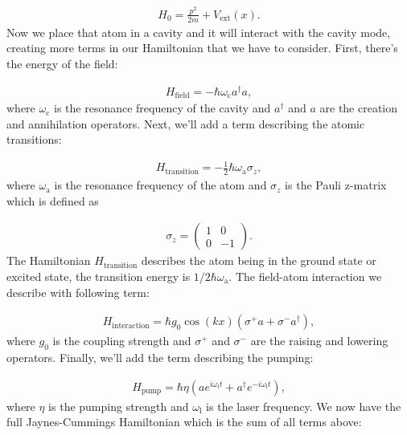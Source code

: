 \begin{align}
H_0 = \frac{p^2}{2m} + V_\text{ext}(x).
\end{align}Now we place that atom in a cavity and it will interact with the cavity mode, creating more terms in our Hamiltonian that we have to consider. First, there's the energy of the field:

\begin{align}
H_\text{field} = -\hbar \omega_\text{c} a^\dagger a,
\end{align}where $\omega_\text{c}$ is the resonance frequency of the cavity and $a^\dagger$ and $a$ are the creation and annihilation operators. Next, we'll add a term describing the atomic transitions:

\begin{align}
H_\text{transition} = -\frac{1}{2}\hbar \omega_\text{a} \sigma_z,
\end{align}where $\omega_\text{a}$ is the resonance frequency of the atom and $\sigma_z$ is the Pauli z-matrix which is defined as

\begin{align}
\sigma_z = \begin{pmatrix}1 & 0 \\ 0 & -1\end{pmatrix}.
\end{align} The Hamiltonian $H_\text{transition}$ describes the atom being in the ground state or excited state, the transition energy is $1/2\hbar \omega_\text{a}$. The field-atom interaction we describe with following term:

\begin{align}
H_\text{interaction} = \hbar g_0 \cos(kx) (\sigma^+ a + \sigma^- a^\dagger),
\end{align}where $g_0$ is the coupling strength and $\sigma^+$ and $\sigma^-$ are the raising and lowering operators. Finally, we'll add the term describing the pumping:

\begin{align}
H_\text{pump} = \hbar \eta (a e^{i\omega_\text{l}t} + a^\dagger e^{-i\omega_\text{l}t}),
\end{align}where $\eta$ is the pumping strength and $\omega_\text{l}$ is the laser frequency. We now have the full Jaynes-Cummings Hamiltonian which is the sum of all terms above:

